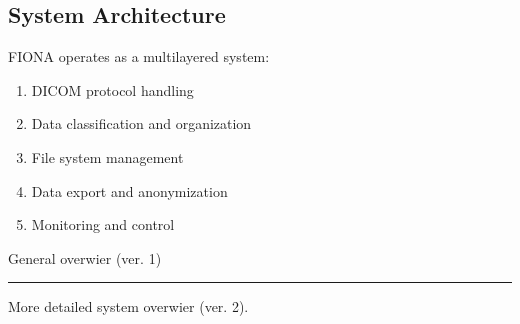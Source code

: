 \documentclass[letterpaper,10pt,english]{sphinxmanual}
\begin{document}
\subsection{System Architecture}
\label{\detokenize{Temp/architecture-options:system-architecture}}
\sphinxAtStartPar
FIONA operates as a multi\sphinxhyphen{}layered system:
\begin{enumerate}
%
\item {} 
\sphinxAtStartPar
{} \sphinxhyphen{} DICOM protocol handling

\item {} 
\sphinxAtStartPar
{} \sphinxhyphen{} Data classification and organization

\item {} 
\sphinxAtStartPar
{} \sphinxhyphen{} File system management

\item {} 
\sphinxAtStartPar
{} \sphinxhyphen{} Data export and anonymization

\item {} 
\sphinxAtStartPar
{} \sphinxhyphen{} Monitoring and control

\end{enumerate}

\sphinxAtStartPar
General overwier (ver. 1)



\bigskip\hrule\bigskip


\sphinxAtStartPar
More detailed system overwier (ver. 2).

\end{document}
